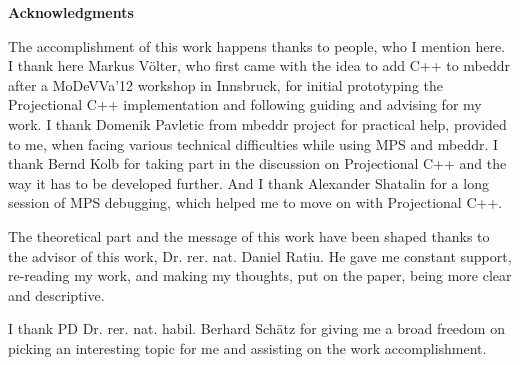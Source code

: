 \clearemptydoublepage
{}
{}	



\vspace*{2cm}

\begin{center}
{\Large \bf Acknowledgments}
\end{center}

\vspace{1cm}


The accomplishment of this work happens thanks to people, who I mention here. I thank here Markus V{\"o}lter, who
first came with the idea to add C++ to mbeddr after a MoDeVVa'12 workshop in Innsbruck, for initial prototyping the 
Projectional C++ implementation and following guiding and advising for my work. I thank Domenik Pavletic from mbeddr 
project for practical help, provided to me, when facing various technical difficulties while using 
MPS and mbeddr. I thank Bernd Kolb for taking part in the discussion on Projectional C++ and the way 
it has to be developed further. And I thank Alexander Shatalin for a long session of MPS debugging, 
which helped me to move on with Projectional C++.

The theoretical part and the message of this work have been shaped thanks to the advisor of this work, 
Dr. rer. nat. Daniel Ratiu. He gave me constant support, re-reading my work, and making my thoughts, put on the paper,
being more clear and descriptive. 

I thank PD Dr. rer. nat. habil. Berhard Sch{\"a}tz for giving me a broad freedom on picking an interesting topic for 
me and assisting on the work accomplishment.